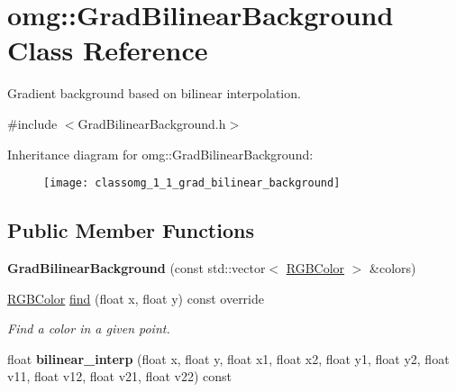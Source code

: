 \hypertarget{classomg_1_1_grad_bilinear_background}{}\section{omg\+::Grad\+Bilinear\+Background Class Reference}
\label{classomg_1_1_grad_bilinear_background}


Gradient background based on bilinear interpolation.  




{\ttfamily \#include $<$Grad\+Bilinear\+Background.\+h$>$}

Inheritance diagram for omg\+::Grad\+Bilinear\+Background\+:\begin{figure}[H]
\begin{center}
\leavevmode
\texttt{[image: classomg\_1\_1\_grad\_bilinear\_background]}
\end{center}
\end{figure}
\subsection*{Public Member Functions}
\begin{DoxyCompactItemize}
\item 
\mbox{\label{classomg_1_1_grad_bilinear_background_ab65634d8eb49ebe3303cb171d41b9d15}} 
{\bfseries Grad\+Bilinear\+Background} (const std\+::vector$<$ \mbox{\hyperlink{namespaceomg_a92d9bbc48ad35def2aa4b0ac3a5b22ae}{R\+G\+B\+Color}} $>$ \&colors)
\item 
\mbox{\hyperlink{namespaceomg_a92d9bbc48ad35def2aa4b0ac3a5b22ae}{R\+G\+B\+Color}} \mbox{\hyperlink{classomg_1_1_grad_bilinear_background_a074c489f7e8514420bd1e1f362202b03}{find}} (float x, float y) const override
\begin{DoxyCompactList}\small\item\em Find a color in a given point. \end{DoxyCompactList}\item 
\mbox{\label{classomg_1_1_grad_bilinear_background_a335f0acd0a4c56bcec29c33891ea5f44}} 
float {\bfseries bilinear\+\_\+interp} (float x, float y, float x1, float x2, float y1, float y2, float v11, float v12, float v21, float v22) const
\end{DoxyCompactItemize}


